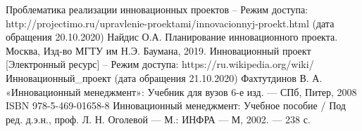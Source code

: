 \newpage
{}

\begin{thebibliography}{}
      Проблематика реализации инновационных проектов -- Режим доступа:
    http://projectimo.ru/upravlenie-proektami/innovacionnyj-proekt.html (дата обращения 20.10.2020)
       Найдис О.А. Планирование инновационного проекта. Москва, Изд-во МГТУ им Н.Э. Баумана, 2019.
      Инновационный проект [Электронный ресурс] -- Режим доступа:
    https://ru.wikipedia.org/wiki/Инновационный\_проект (дата обращения 21.10.2020)
      Фахтутдинов В. А. «Инновационный менеджмент»: Учебник для вузов 6-е изд. — СПб, Питер, 2008 ISBN 978-5-469-01658-8
      Инновационный менеджмент: Учебное пособие / Под ред. д.э.н., проф. Л. Н. Оголевой — М.: ИНФРА — М, 2002. — 238 с.
\end{thebibliography}
